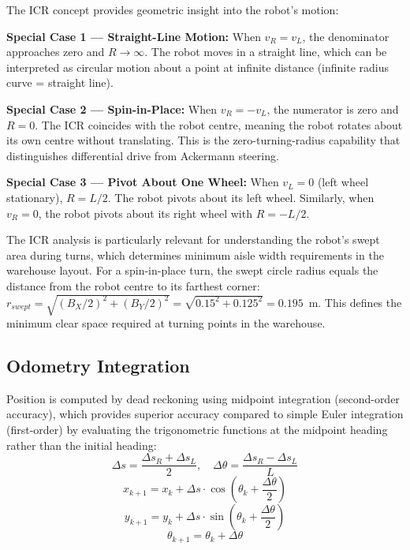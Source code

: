 \documentclass[12pt,a4paper,oneside]{report}
\begin{document}
The ICR concept provides geometric insight into the robot's motion:

\textbf{Special Case 1 --- Straight-Line Motion:} When $v_R = v_L$, the denominator approaches zero and $R \rightarrow \infty$. The robot moves in a straight line, which can be interpreted as circular motion about a point at infinite distance (infinite radius curve = straight line).

\textbf{Special Case 2 --- Spin-in-Place:} When $v_R = -v_L$, the numerator is zero and $R = 0$. The ICR coincides with the robot centre, meaning the robot rotates about its own centre without translating. This is the zero-turning-radius capability that distinguishes differential drive from Ackermann steering.

\textbf{Special Case 3 --- Pivot About One Wheel:} When $v_L = 0$ (left wheel stationary), $R = L/2$. The robot pivots about its left wheel. Similarly, when $v_R = 0$, the robot pivots about its right wheel with $R = -L/2$.

The ICR analysis is particularly relevant for understanding the robot's swept area during turns, which determines minimum aisle width requirements in the warehouse layout. For a spin-in-place turn, the swept circle radius equals the distance from the robot centre to its farthest corner: $r_{swept} = \sqrt{(B_X/2)^2 + (B_Y/2)^2} = \sqrt{0.15^2 + 0.125^2} = 0.195$~m. This defines the minimum clear space required at turning points in the warehouse.

\subsection{Odometry Integration}

Position is computed by dead reckoning using midpoint integration (second-order accuracy), which provides superior accuracy compared to simple Euler integration (first-order) by evaluating the trigonometric functions at the midpoint heading rather than the initial heading:
\begin{equation}
\Delta s = \frac{\Delta s_R + \Delta s_L}{2}, \quad \Delta\theta = \frac{\Delta s_R - \Delta s_L}{L}
\label{eq:odom_increments}
\end{equation}
\begin{equation}
x_{k+1} = x_k + \Delta s \cdot \cos\left(\theta_k + \frac{\Delta\theta}{2}\right)
\label{eq:odom_x}
\end{equation}
\begin{equation}
y_{k+1} = y_k + \Delta s \cdot \sin\left(\theta_k + \frac{\Delta\theta}{2}\right)
\label{eq:odom_y}
\end{equation}
\begin{equation}
\theta_{k+1} = \theta_k + \Delta\theta
\label{eq:odom_theta}
\end{equation}
\end{document}

